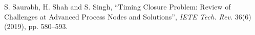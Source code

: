 S. Saurabh, H. Shah and S. Singh,
``Timing Closure Problem: Review of Challenges at Advanced Process Nodes and Solutions'',
{\em IETE Tech. Rev.} 36(6) (2019), pp. 580--593.
